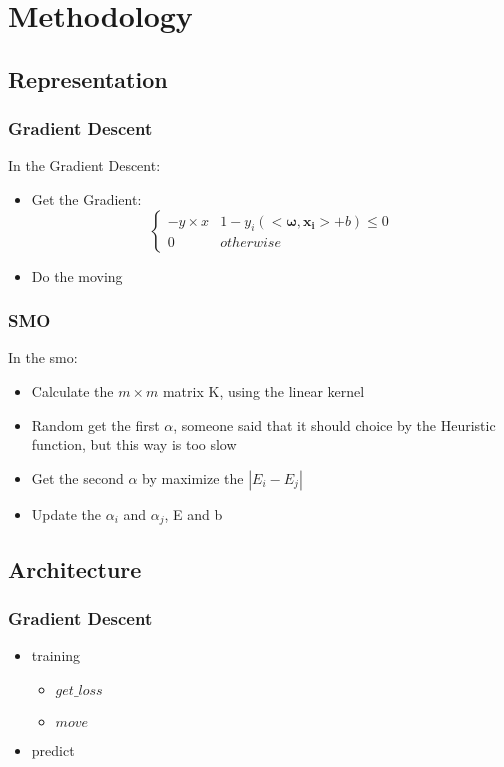 \documentclass[conference,compsoc]{IEEEtran}
\begin{document}
\section{Methodology}
	\subsection{Representation}
			\subsubsection{Gradient Descent}
				In the Gradient Descent:
				\begin{itemize}
					\item Get the Gradient:
					\begin{equation}
						\left\{
							\begin{array}{lr}
								-y\times x & 1-y_i(<\bm{\omega},\bm{x_i}>+b)\leq 0\\
								0 & otherwise
							\end{array}
						\right.
					\end{equation}
				\item Do the moving
			\end{itemize}
			\subsubsection{SMO}
			In the smo:
			\begin{itemize}
				\item Calculate the $m\times m$ matrix K, using the linear kernel
				\item Random get the first $\alpha$, someone said that it should choice by the Heuristic function, but this way is too slow
				\item Get the second $\alpha$ by maximize the $|E_i-E_j|$
				\item Update the $\alpha_i$ and $\alpha_j$, E and b
			\end{itemize}
	\subsection{Architecture}
			\subsubsection{Gradient Descent}
				\begin{itemize}
					\item training
						\begin{itemize}
							\item $get\_loss$
							\item $move$
						\end{itemize}
					\item predict
				\end{itemize}
\end{document}
